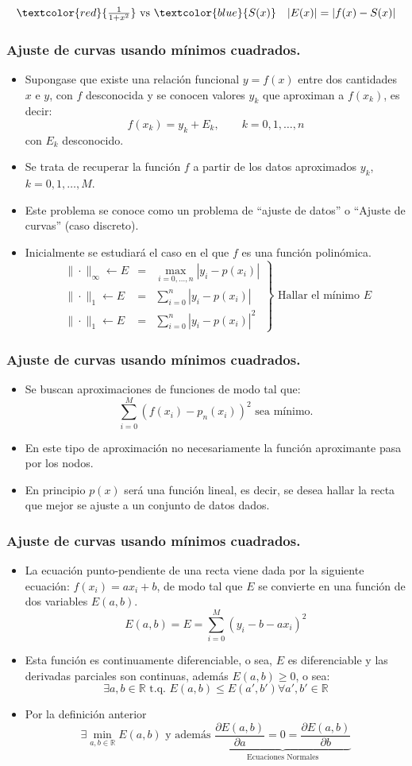 \documentclass[10pt]{beamer}
\begin{document}
{$$\begin{array}{cc}
\textcolor{red}{\frac{1}{1+x^2}} \text{ vs }\textcolor{blue}{S(x)} & |E(x)|=|f(x)-S(x)| 
\end{array}
$$
}
\frame
{
\frametitle{Ajuste de curvas usando m\'inimos cuadrados.} 
\begin{itemize}
\item<1-> Supongase que existe una relaci\'on funcional $y=f(x)$ entre dos cantidades $x$ e $y$, con $f$ desconocida y se conocen valores
$y_k$ que aproximan a $f(x_k)$, es decir:
$$
f(x_k)=y_k+E_k, \qquad  k=0,1,\ldots,n
$$
con $E_k$ desconocido.
\item<2-> Se trata de recuperar la funci\'on $f$ a partir de los datos aproximados $y_k$, $k=0,1,\ldots,M$.
\item<3-> Este problema se conoce como un
problema de ``ajuste de datos'' o ``Ajuste de curvas'' (caso discreto).
\item<4->Inicialmente se estudiar\'a el caso en el que $f$ es una funci\'on polin\'omica.
$$
\left. \begin{array}{rcl}
        \|\cdot\|_{\infty} \leftarrow E & = & \max_{i=0,\ldots,n}|y_i - p(x_i)|\\
        \|\cdot\|_{1} \leftarrow E & = & \sum_{i=0}^n|y_i - p(x_i)|\\
        \|\cdot\|_{1} \leftarrow E & = & \sum_{i=0}^n|y_i - p(x_i)|^2
       \end{array}
\right\} \mbox{ Hallar el m\'inimo $E$}
$$
\end{itemize}
}
\frame
{
\frametitle{Ajuste de curvas usando m\'inimos cuadrados.}
\begin{itemize}
\item<1-> Se buscan aproximaciones de funciones de modo tal que:
$$
\sum_{i=0}^M(f(x_i) - p_n(x_i))^2 \mbox{ sea m\'inimo.}
$$
\item<2->En este tipo de aproximaci\'on no necesariamente la funci\'on aproximante pasa por los nodos.
\item<3->En principio $p(x)$ ser\'a una funci\'on lineal, es decir, se desea hallar la recta que mejor se ajuste a un conjunto de datos dados.
\end{itemize}
}
\frame
{
\frametitle{Ajuste de curvas usando m\'inimos cuadrados.}
\begin{itemize}
\item<1-> La ecuaci\'on punto-pendiente de una recta viene dada por la siguiente ecuaci\'on: $f(x_i)=ax_i+b$, de modo tal que $E$ se
convierte en una funci\'on de dos variables $E(a,b)$.
$$
E(a,b) = E = \sum_{i=0}^M(y_i - b - ax_i)^2
$$
\item<2-> Esta funci\'on es continuamente diferenciable, o sea, $E$ es diferenciable y las derivadas parciales son continuas, adem\'as
$E(a,b) \geq 0$, o sea:
$$
\exists a,b \in \mathbb{R} \mbox{ t.q. } E(a,b) \leq E(a',b')\forall a',b' \in \mathbb{R}
$$
\item<3->Por la definici\'on anterior
$$
\exists \min_{a,b \in \mathbb{R}}E(a,b) \mbox{ y adem\'as } \underbrace{\dfrac{\partial E(a,b)}{\partial a} = 0 = \dfrac{\partial
E(a,b)}{\partial b}}_{\mbox{Ecuaciones Normales}}
$$
\end{itemize}
}
\end{document}
